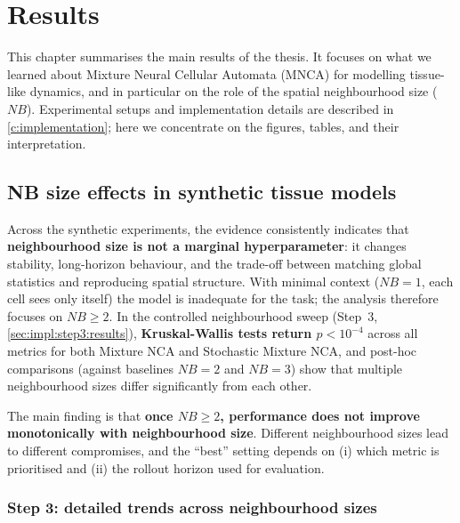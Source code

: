\chapter{Results}
\label{c:results}

This chapter summarises the main results of the thesis. It focuses on what we learned about Mixture Neural Cellular Automata (MNCA) for modelling tissue-like dynamics, and in particular on the role of the spatial neighbourhood size (\(NB\)). Experimental setups and implementation details are described in \cref{c:implementation}; here we concentrate on the figures, tables, and their interpretation.

\section{NB size effects in synthetic tissue models}
\label{sec:results:neighborhood}

Across the synthetic experiments, the evidence consistently indicates that \textbf{neighbourhood size is not a marginal hyperparameter}: it changes stability, long-horizon behaviour, and the trade-off between matching global statistics and reproducing spatial structure.
With minimal context (\(NB=1\), each cell sees only itself) the model is inadequate for the task; the analysis therefore focuses on \(NB \ge 2\).
In the controlled neighbourhood sweep (Step~3, \cref{sec:impl:step3:results}), \textbf{Kruskal-Wallis tests return \(p < 10^{-4}\)} across all metrics for both Mixture NCA and Stochastic Mixture NCA, and post-hoc comparisons (against baselines \(NB=2\) and \(NB=3\)) show that multiple neighbourhood sizes differ significantly from each other.

The main finding is that \textbf{once \(NB \ge 2\), performance does not improve monotonically with neighbourhood size}.
Different neighbourhood sizes lead to different compromises, and the ``best'' setting depends on (i) which metric is prioritised and (ii) the rollout horizon used for evaluation.

\subsection{Step 3: detailed trends across neighbourhood sizes}
\label{sec:results:step3}

